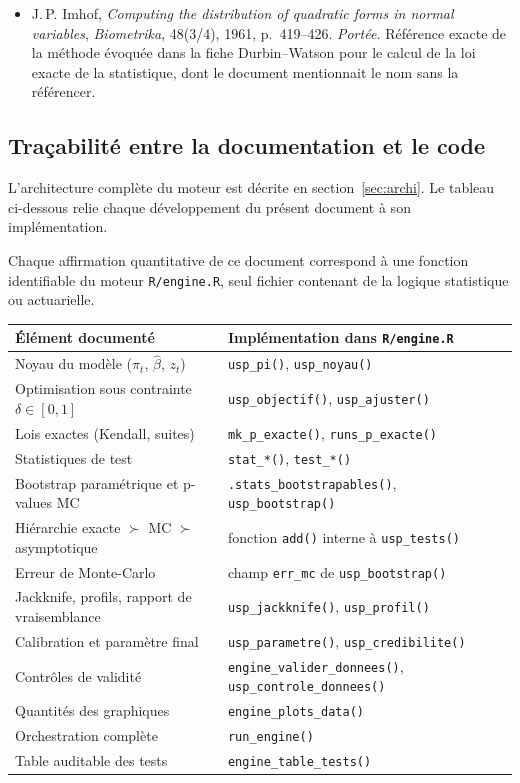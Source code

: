 \documentclass[a4paper,11pt]{article}
\newcommand{\code}[1]{\texttt{\small #1}}
\begin{document}
\begin{itemize}[itemsep=4pt]
  \item J.\,P. Imhof, \emph{Computing the distribution of quadratic forms in
  normal variables}, \emph{Biometrika}, 48(3/4), 1961, p.~419--426.
  \emph{Portée.} Référence exacte de la méthode évoquée dans la
  fiche Durbin--Watson pour le calcul de la loi exacte de la statistique, dont
  le document mentionnait le nom sans la référencer.
\end{itemize}


\subsection{Traçabilité entre la documentation et le code}

\noindent
L'architecture complète du moteur est décrite en section~\ref{sec:archi}.
Le tableau ci-dessous relie chaque développement du présent document à son
implémentation.


Chaque affirmation quantitative de ce document correspond à une fonction
identifiable du moteur \code{R/engine.R}, seul fichier contenant de la logique
statistique ou actuarielle.

\begin{center}
\small
\begin{tabular}{@{}p{5.6cm}p{9.4cm}@{}}
\toprule
\textbf{Élément documenté} & \textbf{Implémentation dans \code{R/engine.R}} \\
\midrule
Noyau du modèle ($\pi_t$, $\hat\beta$, $z_t$) & \code{usp\_pi()}, \code{usp\_noyau()} \\
Optimisation sous contrainte $\delta\in[0,1]$ & \code{usp\_objectif()}, \code{usp\_ajuster()} \\
Lois exactes (Kendall, suites) & \code{mk\_p\_exacte()}, \code{runs\_p\_exacte()} \\
Statistiques de test & \code{stat\_*()}, \code{test\_*()} \\
Bootstrap paramétrique et p-values MC & \code{.stats\_bootstrapables()}, \code{usp\_bootstrap()} \\
Hiérarchie exacte $\succ$ MC $\succ$ asymptotique & fonction \code{add()} interne à \code{usp\_tests()} \\
Erreur de Monte-Carlo & champ \code{err\_mc} de \code{usp\_bootstrap()} \\
Jackknife, profils, rapport de vraisemblance & \code{usp\_jackknife()}, \code{usp\_profil()} \\
Calibration et paramètre final & \code{usp\_parametre()}, \code{usp\_credibilite()} \\
Contrôles de validité & \code{engine\_valider\_donnees()}, \code{usp\_controle\_donnees()} \\
Quantités des graphiques & \code{engine\_plots\_data()} \\
Orchestration complète & \code{run\_engine()} \\
Table auditable des tests & \code{engine\_table\_tests()} \\
\bottomrule
\end{tabular}
\end{center}
\end{document}
